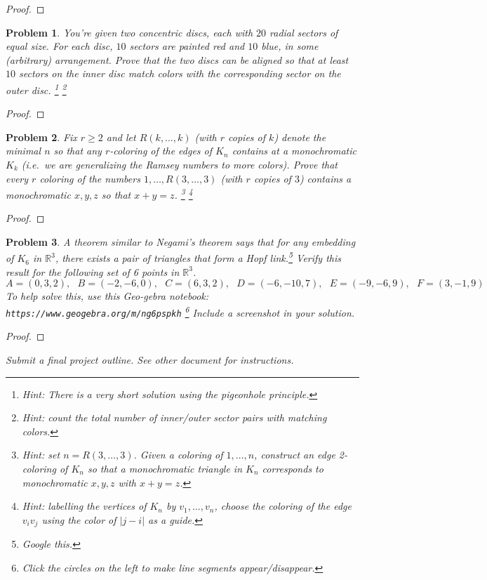 \documentclass[11pt]{article}
\newtheorem{problem}{Problem}
\begin{document}
\begin{proof}

\end{proof}

\pagebreak


\begin{problem}
You're given two concentric discs, each with $20$ radial sectors of equal size. For each disc, $10$ sectors are painted red and $10$ blue, in some (arbitrary) arrangement. Prove that the two discs can be aligned so that at least $10$ sectors on the inner disc match colors with the corresponding sector on the outer disc. \footnote{Hint: There is a very short solution using the pigeonhole principle.} \footnote{Hint: count the total number of inner/outer sector pairs with matching colors.}
\end{problem}

\begin{proof}

\end{proof}

\pagebreak

\begin{problem}
Fix $r\ge2$ and let $R(k,\ldots,k)$ (with $r$ copies of $k$) denote the minimal $n$ so that any $r$-coloring of the edges of $K_n$ contains at a monochromatic $K_k$ (i.e.\ we are generalizing the Ramsey numbers to more colors). Prove that every $r$ coloring of the numbers $1,\ldots,R(3,\ldots,3)$ (with $r$ copies of $3$) contains a monochromatic $x,y,z$ so that $x+y=z$. \footnote{Hint: set $n=R(3,\ldots,3)$. Given a coloring of $1,\ldots,n$, construct an edge 2-coloring of $K_n$ so that a monochromatic triangle in $K_n$ corresponds to monochromatic $x,y,z$ with $x+y=z$.} \footnote{Hint: labelling the vertices of $K_n$ by $v_1,\ldots,v_n$, choose the coloring of the edge $v_iv_j$ using the color of $|j-i|$ as a guide.}
\end{problem}

\begin{proof}

\end{proof}


\pagebreak

\begin{problem}
A theorem similar to Negami's theorem says that for any embedding of $K_6$ in $\mathbb R^3$, there exists a pair of triangles that form a Hopf link.\footnote{Google this.} Verify this result for the following set of 6 points in $\mathbb R^3$. 
\[A=(0,3,2), \>\>\>B=(-2,-6,0), \>\>\>C=(6,3,2), \>\>\>D=(-6,-10,7), \>\>\>E=(-9,-6,9),\>\>\>F=(3,-1,9)\]
To help solve this, use this Geo-gebra notebook: 
\texttt{https://www.geogebra.org/m/ng6pspkh} \footnote{Click the circles on the left to make line segments appear/disappear.} Include a screenshot in your solution. 
\end{problem}

\begin{proof}

\end{proof}

\pagebreak



{\it Submit a final project outline. See other document for instructions. }
\end{document}
